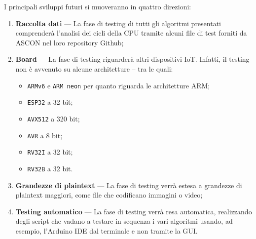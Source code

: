 I principali sviluppi futuri si muoveranno in quattro direzioni:
\begin{enumerate}[label=\Roman*.]
    \item \textbf{Raccolta dati} --- La fase di testing di tutti gli algoritmi presentati comprenderà l'analisi dei cicli della CPU tramite alcuni file di test forniti da ASCON nel loro repository Github\cite{github};
    \item \textbf{Board} --- La fase di testing riguarderà altri dispositivi IoT. Infatti, il testing non è avvenuto su alcune architetture – tra le quali:
    \begin{itemize}
        \item \texttt{ARMv6} e \texttt{ARM neon} per quanto riguarda le architetture ARM;
        \item \texttt{ESP32} a 32 bit;
        \item \texttt{AVX512} a 320 bit;
        \item \texttt{AVR} a 8 bit;
        \item \texttt{RV32I} a 32 bit;
        \item \texttt{RV32B} a 32 bit.
    \end{itemize}
    \item \textbf{Grandezze di plaintext} --- La fase di testing verrà estesa a grandezze di plaintext maggiori, come file che codificano immagini o video;
    \item \textbf{Testing automatico} --- La fase di testing verrà resa automatica, realizzando degli script che vadano a testare in sequenza i vari algoritmi usando, ad esempio, l'Arduino IDE dal terminale e non tramite la GUI.
\end{enumerate}
